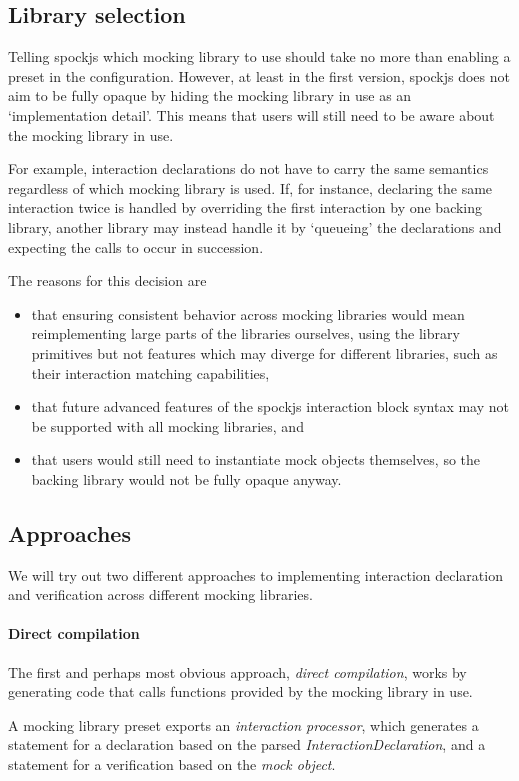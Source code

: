 \subsection{Library selection}
Telling spockjs which mocking library to use should
take no more than enabling a preset in the configuration.
However, at least in the first version,
spockjs does not aim to be fully opaque
by hiding the mocking library in use as an `implementation detail'.
This means that users will still need to be aware
about the mocking library in use.

For example, interaction declarations
do not have to carry the same semantics
regardless of which mocking library is used.
If, for instance, declaring the same interaction twice
is handled by overriding the first interaction by one backing library,
another library may instead handle it by `queueing' the declarations
and expecting the calls to occur in succession.

The reasons for this decision are
\begin{itemize}
  \item that ensuring consistent behavior across mocking libraries would mean
    reimplementing large parts of the libraries ourselves,
    using the library primitives but not features
    which may diverge for different libraries,
    such as their interaction matching capabilities,
  \item that future advanced features of the spockjs interaction block syntax
    may not be supported with all mocking libraries, and
  \item that users would still need to instantiate mock objects themselves,
    so the backing library would not be fully opaque anyway.
\end{itemize}

\subsection{Approaches}
We will try out two different approaches to
implementing interaction declaration and verification
across different mocking libraries.

\paragraph{Direct compilation}
The first and perhaps most obvious approach, \textit{direct compilation},
works by generating code that calls functions
provided by the mocking library in use.

A mocking library preset exports an \textit{interaction processor},
which generates a statement for a declaration
based on the parsed \textit{InteractionDeclaration},
and a statement for a verification
based on the \textit{mock object}.

